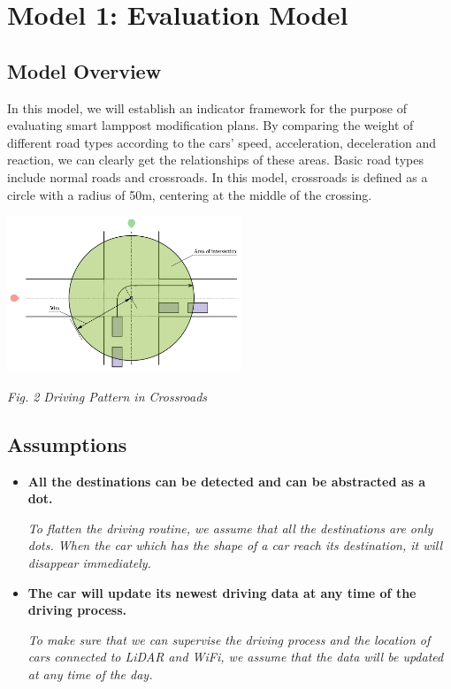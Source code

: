 \documentclass[12pt]{article}
\theoremstyle{definition}
\theoremstyle{remark}
\numberwithin{equation}{section}
\begin{document}
	\newpage
	\section{Model 1: Evaluation Model}	
		\subsection{Model Overview}
		In this model, we will establish an indicator framework for the purpose of evaluating smart lamppost modification plans. By comparing the weight of different road types according to the cars' speed, acceleration, deceleration and reaction, we can clearly get the relationships of these areas. Basic road types include normal roads and crossroads. In this model, crossroads is defined as a circle with a radius of 50m, centering at the middle of the crossing.
		\begin{center}
			\includegraphics[width=7cm]{stimulation.jpg}
			
			\small \textit{Fig. 2 Driving Pattern in Crossroads}
		\end{center}
		\subsection{Assumptions}
		\begin{itemize}
			\item \textbf{All the destinations can be detected and can be abstracted as a dot.}
			
			\textit{To flatten the driving routine, we assume that all the destinations are only dots. When the car which has the shape of a car reach its destination, it will disappear immediately.}
			\item \textbf{The car will update its newest driving data at any time of the driving process.}
			
			\textit{To make sure that we can supervise the driving process and the location of cars connected to LiDAR and WiFi, we assume that the data will be updated at any time of the day.} 
		\end{itemize}
\end{document}
